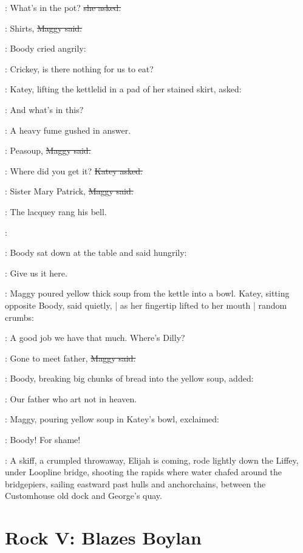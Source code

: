 \katey:
What's in the pot?
\sout{she asked.}

\maggy:
Shirts,
\sout{Maggy said.}

:
Boody cried angrily:

\boody:
Crickey, is there nothing for us to eat?

:
Katey,
lifting the kettlelid in a pad of her stained skirt,
asked:

\katey:
And what's in this?

:
A heavy fume gushed in answer.

\maggy:
Peasoup,
\sout{Maggy said.}

\katey:
Where did you get it?
\sout{Katey asked.}

\maggy:
Sister Mary Patrick,%
\sout{Maggy said.}

\begin{interject}
    :
    The lacquey rang his bell.

    \bell:
\end{interject}

:
Boody sat down at the table and said hungrily:

\boody:
Give us it here.

:
Maggy poured yellow thick soup from the kettle into a bowl.
Katey,
sitting opposite Boody,
said quietly, |
as her fingertip lifted to her mouth |
random crumbs:

\katey:
A good job we have that much.
Where's Dilly?

\maggy:
Gone to meet father,
\sout{Maggy said.}

:
Boody,
breaking big chunks of bread into the yellow soup,%
added:

\boody:
Our father who art not in heaven.

:
Maggy,
pouring yellow soup in Katey's bowl,
exclaimed:

\maggy:
Boody!
For shame!

\begin{interject}
    :
    A skiff,
    a crumpled throwaway,
    Elijah is coming,
    rode lightly down the Liffey,
    under Loopline bridge,
    shooting the rapids where water chafed around the bridgepiers,
    sailing eastward past hulls and anchorchains,
    between the Custom\-house old dock and George's quay.
\end{interject}


\section*{Rock V: Blazes Boylan}

